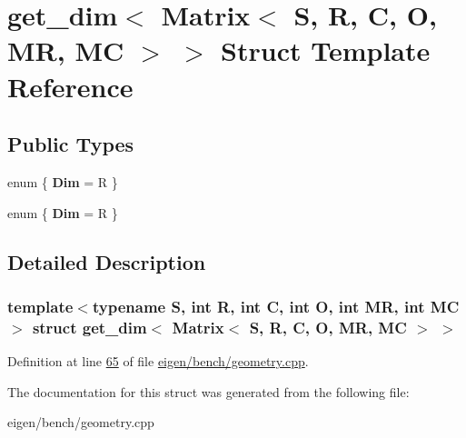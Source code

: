 \hypertarget{structget__dim_3_01_matrix_3_01_s_00_01_r_00_01_c_00_01_o_00_01_m_r_00_01_m_c_01_4_01_4}{}\section{get\+\_\+dim$<$ Matrix$<$ S, R, C, O, MR, MC $>$ $>$ Struct Template Reference}
\label{structget__dim_3_01_matrix_3_01_s_00_01_r_00_01_c_00_01_o_00_01_m_r_00_01_m_c_01_4_01_4}
\subsection*{Public Types}
\begin{DoxyCompactItemize}
\item 
\mbox{\label{structget__dim_3_01_matrix_3_01_s_00_01_r_00_01_c_00_01_o_00_01_m_r_00_01_m_c_01_4_01_4_a801fca650b541b5eb4ee95f74c69930e}} 
enum \{ {\bfseries Dim} = R
 \}
\item 
\mbox{\label{structget__dim_3_01_matrix_3_01_s_00_01_r_00_01_c_00_01_o_00_01_m_r_00_01_m_c_01_4_01_4_a73f6939ef00b8d05144e173bd644e646}} 
enum \{ {\bfseries Dim} = R
 \}
\end{DoxyCompactItemize}


\subsection{Detailed Description}
\subsubsection*{template$<$typename S, int R, int C, int O, int MR, int MC$>$\newline
struct get\+\_\+dim$<$ Matrix$<$ S, R, C, O, M\+R, M\+C $>$ $>$}



Definition at line \hyperlink{eigen_2bench_2geometry_8cpp_source_l00065}{65} of file \hyperlink{eigen_2bench_2geometry_8cpp_source}{eigen/bench/geometry.\+cpp}.



The documentation for this struct was generated from the following file\+:\begin{DoxyCompactItemize}
\item 
eigen/bench/geometry.\+cpp\end{DoxyCompactItemize}

